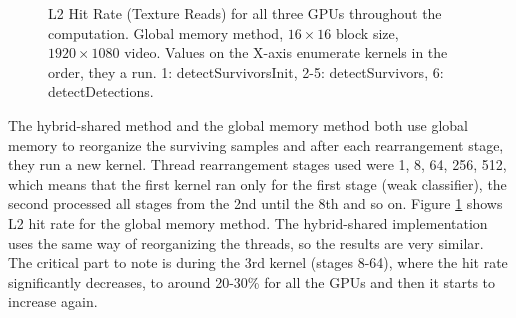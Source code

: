 \begin{figure}[ht]
\centering{}
	\caption{L2 Hit Rate (Texture Reads) for all three GPUs throughout the computation. Global memory method, $16 \times 16$ block size, $1920 \times 1080$ video. Values on the X-axis enumerate kernels in the order, they a run. 1: detectSurvivorsInit, 2-5: detectSurvivors, 6: detectDetections.}
	\label{fig:l2-hit-rate-global}
\end{figure}

The hybrid-shared method and the global memory method both use global memory to reorganize the surviving samples and after each rearrangement stage, they run a new kernel. Thread rearrangement stages used were 1, 8, 64, 256, 512, which means that the first kernel ran only for the first stage (weak classifier), the second processed all stages from the 2nd until the 8th and so on. Figure \ref{fig:l2-hit-rate-global} shows L2 hit rate for the global memory method. The hybrid-shared implementation uses the same way of reorganizing the threads, so the results are very similar. The critical part to note is during the 3rd kernel (stages 8-64), where the hit rate significantly decreases, to around 20-30\% for all the GPUs and then it starts to increase again.

